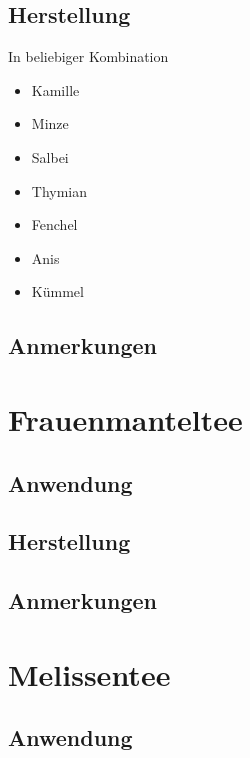 \subsection{Herstellung}

In beliebiger Kombination

\begin{itemize}
	\item Kamille
	\item Minze
	\item Salbei
	\item Thymian
	\item Fenchel
	\item Anis
	\item Kümmel
\end{itemize}

\subsection{Anmerkungen}






\section{Frauenmanteltee}

\subsection{Anwendung}

\subsection{Herstellung}

\subsection{Anmerkungen}







\section{Melissentee}

\subsection{Anwendung}

